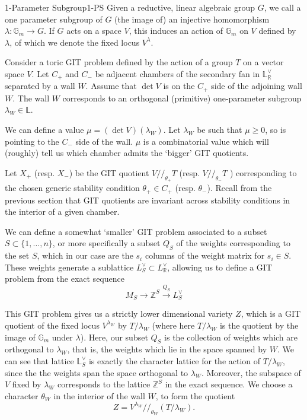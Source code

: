 \begin{definition}{1-Parameter Subgroup}{1-PS}
    Given a reductive, linear algebraic group $G$, we call a one parameter subgroup of $G$ (the image of) an injective homomorphism $\lambda : \mathbb{G}_{m}\to G$. If $G$ acts on a space $V$, this induces an action of $\mathbb{G}_m$ on $V$ defined by $\lambda$, of which we denote the fixed locus $V^\lambda$. 
\end{definition}

Consider a toric GIT problem defined by the action of a group $T$ on a vector space $V$. Let $C_+$ and $C_-$ be adjacent chambers of the secondary fan in $\mathbb{L}^{\vee}_\mathbb{R}$ separated by a wall $W$. Assume that $\det V$ is on the $C_{+}$ side of the adjoining wall $W$. The wall $W$ corresponds to an orthogonal (primitive) one-parameter subgroup $\lambda_{W}\in \mathbb{L}$.

We can define a value $\mu = (\det V)(\lambda_W)$. Let $\lambda_W$ be such that $\mu \geq 0$, so is pointing to the $C_-$ side of the wall. $\mu$ is a combinatorial value which will (roughly) tell us which chamber admits the `bigger' GIT quotients. 

Let $X_+$ (resp. $X_-$) be the GIT quotient $V // _{\theta_{+}}T$ (resp. $V // _{\theta_{-}}T$ ) corresponding to the chosen generic stability condition $\theta_{+}\in C_+$ (resp. $\theta_-$).  Recall from the previous section that GIT quotients are invariant across stability conditions in the interior of a given chamber. 

We can define a somewhat `smaller' GIT problem associated to a subset $S \subset \{ 1,\dots,n \}$, or more specifically a subset $Q_S$ of the weights corresponding to the set $S$, which in our case are the $s_i$ columns of the weight matrix for $s_{i}\in S$. These weights generate a sublattice $L_{S}^\vee\subset L_\mathbb{R}^\vee$, allowing us to define a GIT problem from the exact sequence $$M_{S}\to \mathbb{Z}^{S}\xrightarrow{Q_{S}}L_{S}^{\vee}$$

This GIT problem gives us a strictly lower dimensional variety $Z$, which is a GIT quotient of the fixed locus $V^{\lambda_{W}}$ by $T/\lambda_W$ (where here $T/ \lambda_W$ is the quotient by the image of $\mathbb{G}_m$ under $\lambda$). Here, our subset $Q_S$  is the collection of weights which are orthogonal to $\lambda_W$, that is, the weights which lie in the space spanned by $W$. We can see that lattice $\mathbb{L}_S^\vee$ is exactly the character lattice for the action of $T/\lambda_W$, since the the weights span the space orthogonal to $\lambda_W$. Moreover, the subspace of $V$ fixed by $\lambda_W$ corresponds to the lattice $\mathbb{Z}^S$ in the exact sequence. We choose a character $\theta_W$ in the interior of the wall $W$, to form the quotient $$Z = V^{\lambda_{W}} / /_{\theta_{W}} \left( T/ \lambda_{W}\right) . $$


